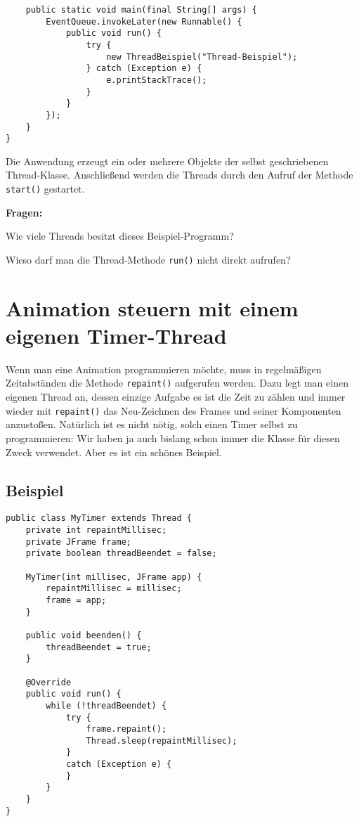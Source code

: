 \begin{compactenum}[a)]
\begin{lstlisting}
    public static void main(final String[] args) {
        EventQueue.invokeLater(new Runnable() {
            public void run() {
                try {
                    new ThreadBeispiel("Thread-Beispiel");
                } catch (Exception e) {
                    e.printStackTrace();
                }
            }
        });
    }
}
\end{lstlisting}

Die Anwendung erzeugt ein oder mehrere Objekte der selbst geschriebenen
Thread-Klasse. Anschließend werden die Threads durch den Aufruf der Methode
\lstinline|start()| gestartet.

\textbf{Fragen:}

\begin{compactenum}[1.]
\item Wie viele Threads besitzt dieses Beispiel-Programm?
\item Wieso darf man die Thread-Methode \lstinline|run()| nicht direkt aufrufen?
\end{compactenum}

\end{compactenum}


\section{Animation steuern mit einem eigenen Timer-Thread}

Wenn man eine Animation programmieren möchte, muss in regelmäßigen Zeitabständen
die Methode \lstinline|repaint()| aufgerufen werden. Dazu legt man einen eigenen
Thread an, dessen einzige Aufgabe es ist die Zeit zu zählen und immer wieder mit
\lstinline|repaint()| das Neu-Zeichnen des Frames und seiner Komponenten
anzustoßen. Natürlich ist es nicht nötig, solch einen Timer selbst zu
programmieren: Wir haben ja auch bislang schon immer die Klasse
 für diesen Zweck verwendet. Aber es ist ein schönes
Beispiel.

\subsection{Beispiel}

\begin{lstlisting}
public class MyTimer extends Thread {
    private int repaintMillisec;
    private JFrame frame;
    private boolean threadBeendet = false;

    MyTimer(int millisec, JFrame app) {
        repaintMillisec = millisec;
        frame = app;
    }

    public void beenden() {
        threadBeendet = true;
    }

    @Override	
    public void run() {
        while (!threadBeendet) {
            try {
                frame.repaint();
                Thread.sleep(repaintMillisec);
            }
            catch (Exception e) {
            }
        }
    }
}
\end{lstlisting}

